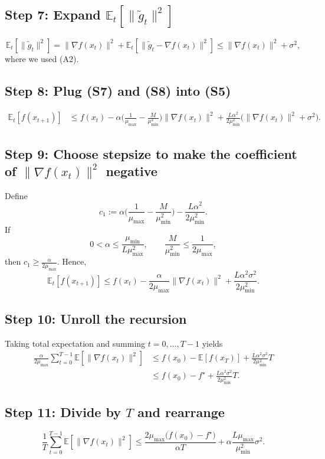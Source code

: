 \documentclass{article}
\newcommand{\E}{\mathbb{E}}
\begin{document}
\subsection*{Step 7: Expand $\E_t[\|\tilde g_t\|^{2}]$}
\[
\E_t[\|\tilde g_t\|^{2}]
= \|\nabla f(x_t)\|^{2}
+ \E_t[\|\tilde g_t-\nabla f(x_t)\|^{2}]
\le \|\nabla f(x_t)\|^{2}+\sigma^{2},
\tag{S8}
\]
where we used (A2).

\subsection*{Step 8: Plug (S7) and (S8) into (S5)}
\[
\begin{aligned}
\E_t[f(x_{t+1})]
&\le f(x_t)
-\alpha\Big(\frac{1}{\mu_{\max}}-\frac{M}{\mu_{\min}^{2}}\Big)\|\nabla f(x_t)\|^{2}
+\frac{L\alpha^{2}}{2\mu_{\min}^{2}}\big(\|\nabla f(x_t)\|^{2}+\sigma^{2}\big).
\end{aligned}
\tag{S9}
\]

\subsection*{Step 9: Choose stepsize to make the coefficient of $\|\nabla f(x_t)\|^{2}$ negative}
Define
\[
c_1:=\alpha\Big(\frac{1}{\mu_{\max}}-\frac{M}{\mu_{\min}^{2}}\Big)
-\frac{L\alpha^{2}}{2\mu_{\min}^{2}}.
\]
If
\[
0<\alpha\le\frac{\mu_{\min}}{L\mu_{\max}^{2}},
\qquad
\frac{M}{\mu_{\min}^{2}}\le\frac{1}{2\mu_{\max}},
\]
then $c_1\ge\frac{\alpha}{2\mu_{\max}}$. Hence,
\[
\E_t[f(x_{t+1})]\le f(x_t)-\frac{\alpha}{2\mu_{\max}}\|\nabla f(x_t)\|^{2}
+\frac{L\alpha^{2}\sigma^{2}}{2\mu_{\min}^{2}}.
\tag{S10}
\]

\subsection*{Step 10: Unroll the recursion}
Taking total expectation and summing $t=0,\dots,T-1$ yields
\[
\begin{aligned}
\frac{\alpha}{2\mu_{\max}}\sum_{t=0}^{T-1}\E[\|\nabla f(x_t)\|^{2}]
&\le f(x_0)-\E[f(x_T)]
+\frac{L\alpha^{2}\sigma^{2}}{2\mu_{\min}^{2}}T\\
&\le f(x_0)-f^{\star}
+\frac{L\alpha^{2}\sigma^{2}}{2\mu_{\min}^{2}}T.
\end{aligned}
\tag{S11}
\]

\subsection*{Step 11: Divide by $T$ and rearrange}
\[
\frac{1}{T}\sum_{t=0}^{T-1}\E[\|\nabla f(x_t)\|^{2}]
\le
\frac{2\mu_{\max}\big(f(x_0)-f^{\star}\big)}{\alpha T}
+ \alpha\frac{L\mu_{\max}}{\mu_{\min}^{2}}\sigma^{2}.
\tag{S12}
\]
\end{document}
